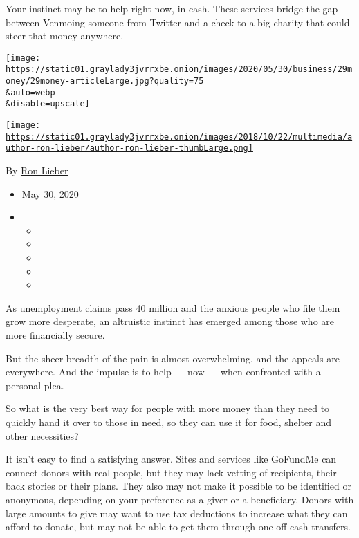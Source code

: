 Your instinct may be to help right now, in cash. These services bridge
the gap between Venmoing someone from Twitter and a check to a big
charity that could steer that money anywhere.

\texttt{[image: https://static01.graylady3jvrrxbe.onion/images/2020/05/30/business/29money/29money-articleLarge.jpg?quality=75\\\&auto=webp\\\&disable=upscale]}

\href{https://www.nytimes3xbfgragh.onion/by/ron-lieber}{\texttt{[image: https://static01.graylady3jvrrxbe.onion/images/2018/10/22/multimedia/author-ron-lieber/author-ron-lieber-thumbLarge.png]}}

By \href{https://www.nytimes3xbfgragh.onion/by/ron-lieber}{Ron Lieber}

\begin{itemize}
\item
  May 30, 2020
\item
  \begin{itemize}
  \item
  \item
  \item
  \item
  \item
  \end{itemize}
\end{itemize}

As unemployment claims pass
\href{https://www.nytimes3xbfgragh.onion/2020/05/28/business/economy/coronavirus-unemployment-claims.html}{40
million} and the anxious people who file them
\href{https://www.nytimes3xbfgragh.onion/2020/05/28/business/economy/coronavirus-stimulus-unemployment.html}{grow
more desperate}, an altruistic instinct has emerged among those who are
more financially secure.

But the sheer breadth of the pain is almost overwhelming, and the
appeals are everywhere. And the impulse is to help --- now --- when
confronted with a personal plea.

So what is the very best way for people with more money than they need
to quickly hand it over to those in need, so they can use it for food,
shelter and other necessities?

It isn't easy to find a satisfying answer. Sites and services like
GoFundMe can connect donors with real people, but they may lack vetting
of recipients, their back stories or their plans. They also may not make
it possible to be identified or anonymous, depending on your preference
as a giver or a beneficiary. Donors with large amounts to give may want
to use tax deductions to increase what they can afford to donate, but
may not be able to get them through one-off cash transfers.


